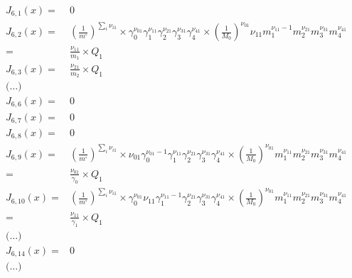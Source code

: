 \documentclass[onecolumn]{article}
\begin{document}
\[
\begin{aligned}
J_{6,1}(x) = & 0 \\
J_{6,2}(x) = &
\left(\frac{1}{m^{\circ}}\right)^{\sum_i{\nu_{i1}}}\times
\gamma_0^{\nu_{01}}\gamma_1^{\nu_{11}}\gamma_2^{\nu_{21}}
\gamma_3^{\nu_{31}}\gamma_4^{\nu_{41}}\times
\left(\frac{1}{M_0}\right)^{\nu_{01}}
\nu_{11}m_1^{\nu_{11}-1}m_2^{\nu_{21}}
m_3^{\nu_{31}}m_4^{\nu_{41}}\\
= & \frac{\nu_{11}}{m_{1}} \times Q_1\\
J_{6,3}(x) =& \frac{\nu_{21}}{m_2} \times Q_1\\
\text{(...)}\\
J_{6,6}(x) =& 0\\
J_{6,7}(x) =& 0\\
J_{6,8}(x) =& 0\\
J_{6,9}(x) =&
\left(\frac{1}{m^{\circ}}\right)^{\sum_i{\nu_{i1}}}\times
\nu_{01}\gamma_0^{\nu_{01}-1}\gamma_1^{\nu_{11}}\gamma_2^{\nu_{21}}
\gamma_3^{\nu_{31}}\gamma_4^{\nu_{41}}\times
\left(\frac{1}{M_0}\right)^{\nu_{01}}m_1^{\nu_{11}}m_2^{\nu_{21}}
m_3^{\nu_{31}}m_4^{\nu_{41}}\\
= & \frac{\nu_{01}}{\gamma_{0}} \times Q_1\\
J_{6,10}(x) =&
\left(\frac{1}{m^{\circ}}\right)^{\sum_i{\nu_{i1}}}\times
\gamma_0^{\nu_{01}}\nu_{11}\gamma_1^{\nu_{11}-1}\gamma_2^{\nu_{21}}
\gamma_3^{\nu_{31}}\gamma_4^{\nu_{41}}\times
\left(\frac{1}{M_0}\right)^{\nu_{01}}m_1^{\nu_{11}}m_2^{\nu_{21}}
m_3^{\nu_{31}}m_4^{\nu_{41}}\\
= & \frac{\nu_{11}}{\gamma_{1}} \times Q_1\\
\text{(...)}\\
J_{6,14}(x) =&  0\\
\text{(...)}\\
\end{aligned}
\]
\end{document}
